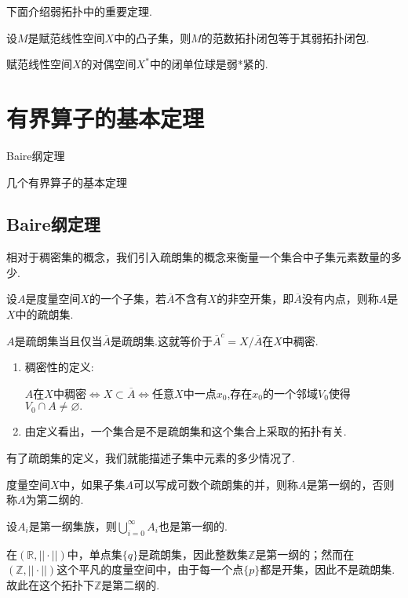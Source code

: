 \documentclass[lang=cn,10pt]{elegantbook}
\begin{document}
	下面介绍弱拓扑中的重要定理.
	\begin{theorem}[Mazur(2.5.7)]
		设\(M\)是赋范线性空间\(X\)中的凸子集，则\(M\)的范数拓扑闭包等于其弱拓扑闭包.
	\end{theorem}
	\begin{theorem}
		赋范线性空间\(X\)的对偶空间\(X^*\)中的闭单位球是弱*紧的.
	\end{theorem}

		\chapter{有界算子的基本定理}
		\begin{introduction}
		\item Baire纲定理
		\item 几个有界算子的基本定理
	\end{introduction}
	\section{Baire纲定理}
	相对于稠密集的概念，我们引入疏朗集的概念来衡量一个集合中子集元素数量的多少.
	\begin{definition}[疏朗集]
		设\(A\)是度量空间\(X\)的一个子集，若\(\overline{A}\)不含有\(X\)的非空开集，即\(\overline{A}\)没有内点，则称\(A\)是\(X\)中的疏朗集.
		
		\(A\)是疏朗集当且仅当\(\overline{A}\)是疏朗集.这就等价于\(\overline{A}^c=X/\overline{A}\)在\(X\)中稠密.
	\end{definition}
	\begin{note}
		\begin{enumerate}
			\item 稠密性的定义:
			
			\(A\)在\(X\)中稠密\(\Leftrightarrow\)\(X \subset \overline{A}\)\(\Leftrightarrow\)任意\(X\)中一点\(x_0\),存在\(x_0\)的一个邻域\(V_0\)使得\(V_0\cap A \ne \varnothing.\)
			\item 由定义看出，一个集合是不是疏朗集和这个集合上采取的拓扑有关.
		\end{enumerate}
	\end{note}
	有了疏朗集的定义，我们就能描述子集中元素的多少情况了.
	\begin{definition}[纲]
		度量空间\(X\)中，如果子集\(A\)可以写成可数个疏朗集的并，则称\(A\)是第一纲的，否则称\(A\)为第二纲的.
	\end{definition}
	\begin{note}
		设\(A_i\)是第一纲集族，则\(\bigcup_{i=0}^\infty A_i\)也是第一纲的.
	\end{note}
	\begin{example}
		在\((\mathbb{R},||\cdot ||)\)中，单点集\(\{q\}\)是疏朗集，因此整数集\(\mathbb{Z}\)是第一纲的；然而在\((\mathbb{Z},||\cdot ||)\)这个平凡的度量空间中，由于每一个点\(\{p\}\)都是开集，因此不是疏朗集.故此在这个拓扑下\(\mathbb{Z}\)是第二纲的.
	\end{example}
	
\end{document}
